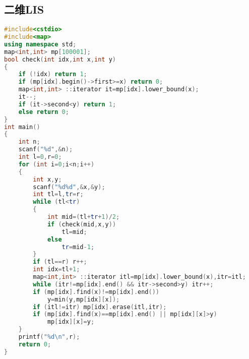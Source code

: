 \subsection{二维LIS}
	\begin{lstlisting}[language=c++]
#include<cstdio>
#include<map>
using namespace std;
map<int,int> mp[100001];
bool check(int idx,int x,int y)
{
	if (!idx) return 1;
	if (mp[idx].begin()->first>=x) return 0;
	map<int,int> ::iterator it=mp[idx].lower_bound(x);
	it--;
	if (it->second<y) return 1;
	else return 0;
}
int main()
{
	int n;
	scanf("%d",&n);
	int l=0,r=0;
	for (int i=0;i<n;i++)
	{
		int x,y;
		scanf("%d%d",&x,&y);
		int tl=l,tr=r;
		while (tl<tr)
		{
			int mid=(tl+tr+1)/2;
			if (check(mid,x,y))
				tl=mid;
			else
				tr=mid-1;
		}
		if (tl==r) r++;
		int idx=tl+1;
		map<int,int> ::iterator itl=mp[idx].lower_bound(x),itr=itl;
		while (itr!=mp[idx].end() && itr->second>y) itr++;
		if (mp[idx].find(x)!=mp[idx].end())
			y=min(y,mp[idx][x]);
		if (itl!=itr) mp[idx].erase(itl,itr);
		if (mp[idx].find(x)==mp[idx].end() || mp[idx][x]>y)
			mp[idx][x]=y;
	}
	printf("%d\n",r);
	return 0;
}
	\end{lstlisting}
